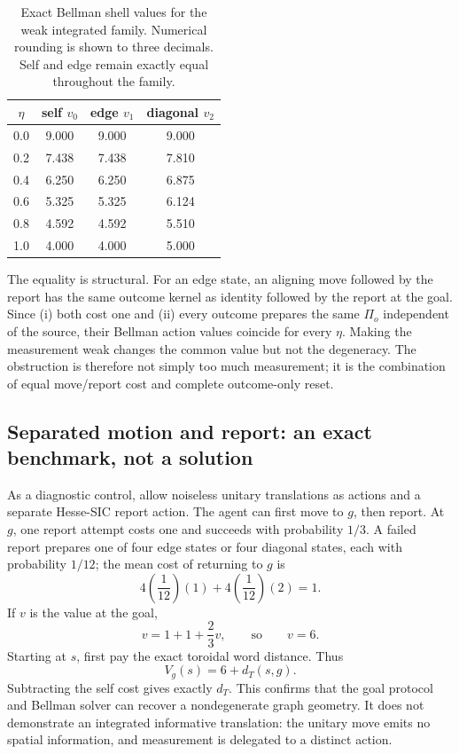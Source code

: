 \documentclass[11pt]{article}
\theoremstyle{definition}
\theoremstyle{remark}
\begin{document}
\begin{table}[H]
\centering
\caption{Exact Bellman shell values for the weak integrated family. Numerical
rounding is shown to three decimals. Self and edge remain exactly equal
throughout the family.}
\label{tab:weak-values}
\begin{tabular}{cccc}
\toprule
\(\eta\) & self \(v_0\) & edge \(v_1\) & diagonal \(v_2\)\\
\midrule
0.0 & 9.000 & 9.000 & 9.000\\
0.2 & 7.438 & 7.438 & 7.810\\
0.4 & 6.250 & 6.250 & 6.875\\
0.6 & 5.325 & 5.325 & 6.124\\
0.8 & 4.592 & 4.592 & 5.510\\
1.0 & 4.000 & 4.000 & 5.000\\
\bottomrule
\end{tabular}
\end{table}

The equality is structural. For an edge state, an aligning move followed by
the report has the same outcome kernel as identity followed by the report at
the goal. Since (i) both cost one and (ii) every outcome prepares the same
\(\Pi_o\) independent of the source, their Bellman action values coincide for
every \(\eta\). Making the measurement weak changes the common value but not
the degeneracy. The obstruction is therefore not simply too much
measurement; it is the combination of equal move/report cost and complete
outcome-only reset.

\subsection{Separated motion and report: an exact benchmark, not a solution}

As a diagnostic control, allow noiseless unitary translations as actions and
a separate Hesse-SIC report action. The agent can first move to \(g\), then
report. At \(g\), one report attempt costs one and succeeds with probability
\(1/3\). A failed report prepares one of four edge states or four diagonal
states, each with probability \(1/12\); the mean cost of returning to \(g\) is
\[
4\left(\frac1{12}\right)(1)+
4\left(\frac1{12}\right)(2)=1.
\]
If \(v\) is the value at the goal,
\[
v=1+1+\frac23v,
\qquad\text{so}\qquad v=6.
\]
Starting at \(s\), first pay the exact toroidal word distance. Thus
\begin{equation}
\boxed{V_g(s)=6+d_T(s,g).}
\label{eq:separated}
\end{equation}
Subtracting the self cost gives exactly \(d_T\). This confirms that the goal
protocol and Bellman solver can recover a nondegenerate graph geometry. It
does not demonstrate an integrated informative translation: the unitary move
emits no spatial information, and measurement is delegated to a distinct
action.
\end{document}
